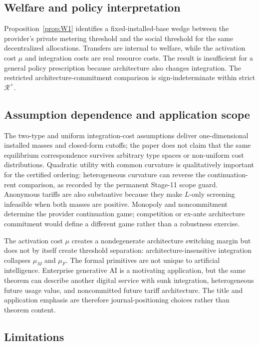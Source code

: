 \subsection{Welfare and policy interpretation}

Proposition~\ref{prop:W1} identifies a fixed-installed-base wedge between the provider's private metering threshold and the social threshold for the same decentralized allocations. Transfers are internal to welfare, while the activation cost $\mu$ and integration costs are real resource costs. The result is insufficient for a general policy prescription because architecture also changes integration. The restricted architecture-commitment comparison is sign-indeterminate within strict $\mathcal R^+$.

\subsection{Assumption dependence and application scope}

The two-type and uniform integration-cost assumptions deliver one-dimensional installed masses and closed-form cutoffs; the paper does not claim that the same equilibrium correspondence survives arbitrary type spaces or non-uniform cost distributions. Quadratic utility with common curvature is qualitatively important for the certified ordering: heterogeneous curvature can reverse the continuation-rent comparison, as recorded by the permanent Stage-11 scope guard. Anonymous tariffs are also substantive because they make $L$-only screening infeasible when both masses are positive. Monopoly and noncommitment determine the provider continuation game; competition or ex-ante architecture commitment would define a different game rather than a robustness exercise.

The activation cost $\mu$ creates a nondegenerate architecture switching margin but does not by itself create threshold separation: architecture-insensitive integration collapses $\mu_M$ and $\mu_F$. The formal primitives are not unique to artificial intelligence. Enterprise generative AI is a motivating application, but the same theorem can describe another digital service with sunk integration, heterogeneous future usage value, and noncommitted future tariff architecture. The title and application emphasis are therefore journal-positioning choices rather than theorem content.

\subsection{Limitations}

